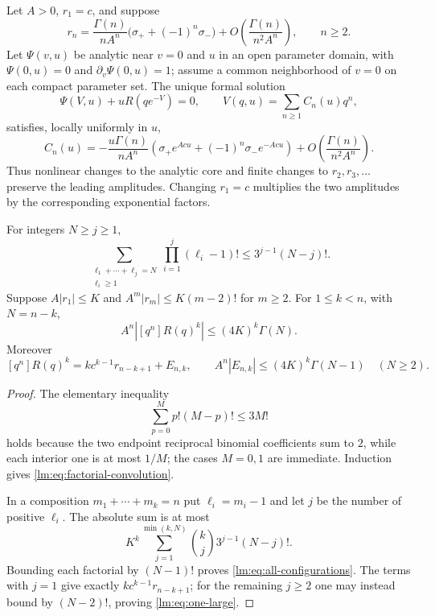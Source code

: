 \begin{theorem}
\label{lm:thm:universal}
Let $A>0$, $r_1=c$, and suppose
\begin{equation}\label{lm:eq:tail-assumption}
 r_n=\frac{\Gamma(n)}{nA^n}
       \bigl(\sigma_++(-1)^n\sigma_-\bigr)
       +O\!\left(\frac{\Gamma(n)}{n^2A^n}\right),\qquad n\geq2.
\end{equation}
Let $\Psi(v,u)$ be analytic near $v=0$ and $u$ in an open parameter
domain, with $\Psi(0,u)=0$ and $\partial_v\Psi(0,u)=1$; assume a
common neighborhood of $v=0$ on each compact parameter set.  The unique
formal solution
\[
 \Psi(V,u)+uR(qe^{-V})=0,
 \qquad V(q,u)=\sum_{n\geq1}C_n(u)q^n,
\]
satisfies, locally uniformly in $u$,
\begin{equation}\label{lm:eq:universal}
 C_n(u)=-\frac{u\Gamma(n)}{nA^n}
 \left(\sigma_+e^{Acu}+(-1)^n\sigma_-e^{-Acu}\right)
 +O\!\left(\frac{\Gamma(n)}{n^2A^n}\right).
\end{equation}
Thus nonlinear changes to the analytic core and finite changes to
$r_2,r_3,\ldots$ preserve the leading amplitudes.  Changing $r_1=c$
multiplies the two amplitudes by the corresponding exponential factors.
\end{theorem}

\begin{lemma}\label{lm:lem:factorials}
For integers $N\geq j\geq1$,
\begin{equation}\label{lm:eq:factorial-convolution}
 \sum_{\substack{\ell_1+\cdots+\ell_j=N\\\ell_i\geq1}}
       \prod_{i=1}^j(\ell_i-1)!
 \leq 3^{j-1}(N-j)!.
\end{equation}
Suppose $A|r_1|\leq K$ and $A^m|r_m|\leq K(m-2)!$ for $m\geq2$.
For $1\leq k<n$, with $N=n-k$,
\begin{equation}\label{lm:eq:all-configurations}
 A^n|[q^n]R(q)^k|\leq(4K)^k\Gamma(N).
\end{equation}
Moreover
\begin{equation}\label{lm:eq:one-large}
 [q^n]R(q)^k=kc^{k-1}r_{n-k+1}+E_{n,k},
 \qquad A^n|E_{n,k}|\leq(4K)^k\Gamma(N-1)\quad(N\geq2).
\end{equation}
\end{lemma}

\begin{proof}
The elementary inequality
\[
 \sum_{p=0}^M p!(M-p)!\leq3M!
\]
holds because the two endpoint reciprocal binomial coefficients sum to
$2$, while each interior one is at most $1/M$; the cases $M=0,1$ are
immediate.  Induction gives \eqref{lm:eq:factorial-convolution}.

In a composition $m_1+\cdots+m_k=n$ put $\ell_i=m_i-1$ and let $j$
be the number of positive $\ell_i$.  The absolute sum is at most
\[
 K^k\sum_{j=1}^{\min(k,N)}\binom{k}{j}3^{j-1}(N-j)!.
\]
Bounding each factorial by $(N-1)!$ proves
\eqref{lm:eq:all-configurations}.  The terms with $j=1$ give exactly
$kc^{k-1}r_{n-k+1}$; for the remaining $j\geq2$ one may instead bound
by $(N-2)!$, proving \eqref{lm:eq:one-large}.
\end{proof}

